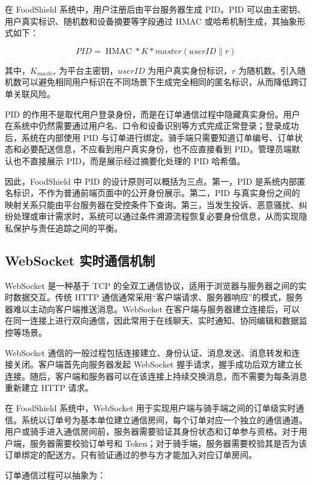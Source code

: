 \documentclass[UTF8,a4paper,zihao=-4,fontset=fandol]{ctexart}
\begin{document}
在 FoodShield 系统中，用户注册后由平台服务器生成 PID。PID 可以由主密钥、用户真实标识、随机数和设备摘要等字段通过 HMAC 或哈希机制生成，其抽象形式如下：

\begin{equation}
PID=\operatorname{HMAC}*{K*{master}}(userID \parallel r)
\end{equation}

其中，$K_{master}$ 为平台主密钥，$userID$ 为用户真实身份标识，$r$ 为随机数。引入随机数可以避免相同用户标识在不同场景下生成完全相同的匿名标识，从而降低跨订单关联风险。

PID 的作用不是取代用户登录身份，而是在订单通信过程中隐藏真实身份。用户在系统中仍然需要通过用户名、口令和设备识别等方式完成正常登录；登录成功后，系统在内部使用 PID 与订单进行绑定。骑手端只需要知道订单编号、订单状态和必要配送信息，不应看到用户真实身份，也不应直接看到 PID。管理员端默认也不直接展示 PID，而是展示经过摘要化处理的 PID 哈希值。

因此，FoodShield 中 PID 的设计原则可以概括为三点。第一，PID 是系统内部匿名标识，不作为普通前端页面中的公开身份展示。第二，PID 与真实身份之间的映射关系只能由平台服务器在受控条件下查询。第三，当发生投诉、恶意骚扰、纠纷处理或审计需求时，系统可以通过条件溯源流程恢复必要身份信息，从而实现隐私保护与责任追踪之间的平衡。

\subsection{WebSocket 实时通信机制}

WebSocket 是一种基于 TCP 的全双工通信协议，适用于浏览器与服务器之间的实时数据交互。传统 HTTP 通信通常采用“客户端请求、服务器响应”的模式，服务器难以主动向客户端推送消息。WebSocket 在客户端与服务器建立连接后，可以在同一连接上进行双向通信，因此常用于在线聊天、实时通知、协同编辑和数据监控等场景。

WebSocket 通信的一般过程包括连接建立、身份认证、消息发送、消息转发和连接关闭。客户端首先向服务器发起 WebSocket 握手请求，握手成功后双方建立长连接。随后，客户端和服务器可以在该连接上持续交换消息，而不需要为每条消息重新建立 HTTP 请求。

在 FoodShield 系统中，WebSocket 用于实现用户端与骑手端之间的订单级实时通信。系统以订单号为基本单位建立通信房间，每个订单对应一个独立的通信通道。用户或骑手进入通信房间前，服务器需要验证其身份状态和订单参与资格。对于用户端，服务器需要校验订单号和 Token；对于骑手端，服务器需要校验其是否为该订单绑定的配送方。只有验证通过的参与方才能加入对应订单房间。

订单通信过程可以抽象为：
\end{document}
